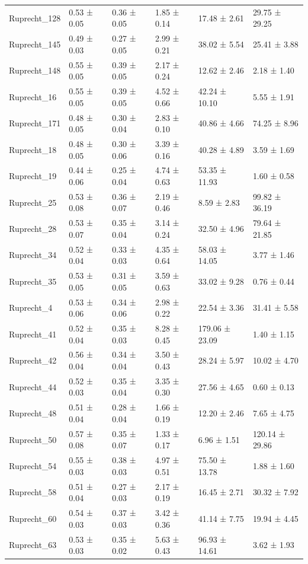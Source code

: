 \begin{tabular}{llllll}
Ruprecht_128 & 0.53 ± 0.05 & 0.36 ± 0.05 & 1.85 ± 0.14 & 17.48 ± 2.61 & 29.75 ± 29.25 \\
Ruprecht_145 & 0.49 ± 0.03 & 0.27 ± 0.05 & 2.99 ± 0.21 & 38.02 ± 5.54 & 25.41 ± 3.88 \\
Ruprecht_148 & 0.55 ± 0.05 & 0.39 ± 0.05 & 2.17 ± 0.24 & 12.62 ± 2.46 & 2.18 ± 1.40 \\
Ruprecht_16 & 0.55 ± 0.05 & 0.39 ± 0.05 & 4.52 ± 0.66 & 42.24 ± 10.10 & 5.55 ± 1.91 \\
Ruprecht_171 & 0.48 ± 0.05 & 0.30 ± 0.04 & 2.83 ± 0.10 & 40.86 ± 4.66 & 74.25 ± 8.96 \\
Ruprecht_18 & 0.48 ± 0.05 & 0.30 ± 0.06 & 3.39 ± 0.16 & 40.28 ± 4.89 & 3.59 ± 1.69 \\
Ruprecht_19 & 0.44 ± 0.06 & 0.25 ± 0.04 & 4.74 ± 0.63 & 53.35 ± 11.93 & 1.60 ± 0.58 \\
Ruprecht_25 & 0.53 ± 0.08 & 0.36 ± 0.07 & 2.19 ± 0.46 & 8.59 ± 2.83 & 99.82 ± 36.19 \\
Ruprecht_28 & 0.53 ± 0.07 & 0.35 ± 0.04 & 3.14 ± 0.24 & 32.50 ± 4.96 & 79.64 ± 21.85 \\
Ruprecht_34 & 0.52 ± 0.04 & 0.33 ± 0.03 & 4.35 ± 0.64 & 58.03 ± 14.05 & 3.77 ± 1.46 \\
Ruprecht_35 & 0.53 ± 0.05 & 0.31 ± 0.05 & 3.59 ± 0.63 & 33.02 ± 9.28 & 0.76 ± 0.44 \\
Ruprecht_4 & 0.53 ± 0.06 & 0.34 ± 0.06 & 2.98 ± 0.22 & 22.54 ± 3.36 & 31.41 ± 5.58 \\
Ruprecht_41 & 0.52 ± 0.04 & 0.35 ± 0.03 & 8.28 ± 0.45 & 179.06 ± 23.09 & 1.40 ± 1.15 \\
Ruprecht_42 & 0.56 ± 0.04 & 0.34 ± 0.04 & 3.50 ± 0.43 & 28.24 ± 5.97 & 10.02 ± 4.70 \\
Ruprecht_44 & 0.52 ± 0.03 & 0.35 ± 0.04 & 3.35 ± 0.30 & 27.56 ± 4.65 & 0.60 ± 0.13 \\
Ruprecht_48 & 0.51 ± 0.04 & 0.28 ± 0.04 & 1.66 ± 0.19 & 12.20 ± 2.46 & 7.65 ± 4.75 \\
Ruprecht_50 & 0.57 ± 0.08 & 0.35 ± 0.07 & 1.33 ± 0.17 & 6.96 ± 1.51 & 120.14 ± 29.86 \\
Ruprecht_54 & 0.55 ± 0.03 & 0.38 ± 0.03 & 4.97 ± 0.51 & 75.50 ± 13.78 & 1.88 ± 1.60 \\
Ruprecht_58 & 0.51 ± 0.04 & 0.27 ± 0.03 & 2.17 ± 0.19 & 16.45 ± 2.71 & 30.32 ± 7.92 \\
Ruprecht_60 & 0.54 ± 0.03 & 0.37 ± 0.03 & 3.42 ± 0.36 & 41.14 ± 7.75 & 19.94 ± 4.45 \\
Ruprecht_63 & 0.53 ± 0.03 & 0.35 ± 0.02 & 5.63 ± 0.43 & 96.93 ± 14.61 & 3.62 ± 1.93 \\

\end{tabular}

